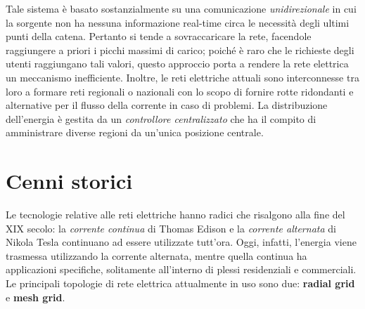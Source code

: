 \newline Tale sistema è basato sostanzialmente su una comunicazione \textit{unidirezionale} in cui la sorgente non ha nessuna informazione real-time circa le necessità degli ultimi punti della catena. Pertanto si tende a sovraccaricare la rete, facendole raggiungere a priori i picchi massimi di carico; poiché è raro che le richieste degli utenti raggiungano tali valori, questo approccio porta a rendere la rete elettrica un meccanismo inefficiente.
\newline
Inoltre, le reti elettriche attuali sono interconnesse tra loro a formare reti regionali o nazionali con lo scopo di fornire rotte ridondanti e alternative per il flusso della corrente in caso di problemi. \newline
La distribuzione dell'energia è gestita da un \textit{controllore centralizzato} che ha il compito di amministrare diverse regioni da un'unica posizione centrale. 
\newpage
\section{Cenni storici}
Le tecnologie relative alle reti elettriche hanno radici che risalgono alla fine del XIX secolo: la \textit{corrente continua} di Thomas Edison e la \textit{corrente alternata} di Nikola Tesla continuano ad essere utilizzate tutt'ora. Oggi, infatti, l'energia viene trasmessa utilizzando la corrente alternata, mentre quella continua ha applicazioni specifiche, solitamente all'interno di plessi residenziali e commerciali. \newline \newline
Le principali topologie di rete elettrica attualmente in uso sono due: \textbf{radial grid} e \textbf{mesh grid}.


